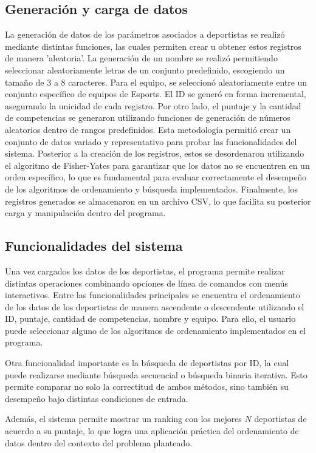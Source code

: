 \subsection{Generación y carga de datos}
La generación de datos de los parámetros asociados a deportistas se realizó mediante distintas funciones, las cuales permiten crear u obtener estos registros de manera 'aleatoria'. La generación de un nombre se realizó permitiendo seleccionar aleatoriamente letras de un conjunto predefinido, escogiendo un tamaño de 3 a 8 caracteres. Para el equipo, se seleccionó aleatoriamente entre un conjunto específico de equipos de Esports. El ID se generó en forma incremental, asegurando la unicidad de cada registro. Por otro lado, el puntaje y la cantidad de competencias se generaron utilizando funciones de generación de números aleatorios dentro de rangos predefinidos. Esta metodología permitió crear un conjunto de datos variado y representativo para probar las funcionalidades del sistema. Posterior a la creación de los registros, estos se desordenaron utilizando el algoritmo de Fisher-Yates para garantizar que los datos no se encuentren en un orden específico, lo que es fundamental para evaluar correctamente el desempeño de los algoritmos de ordenamiento y búsqueda implementados. Finalmente, los registros generados se almacenaron en un archivo CSV, lo que facilita su posterior carga y manipulación dentro del programa.


\subsection{Funcionalidades del sistema}
Una vez cargados los datos de los deportistas, el programa permite realizar distintas operaciones combinando opciones de línea de comandos con menús interactivos. Entre las funcionalidades principales se encuentra el ordenamiento de los datos de los deportistas de manera ascendente o descendente utilizando el ID, puntaje, cantidad de competencias, nombre y equipo. Para ello, el usuario puede seleccionar alguno de los algoritmos de ordenamiento implementados en el programa.

Otra funcionalidad importante es la búsqueda de deportistas por ID, la cual puede realizarse mediante búsqueda secuencial o búsqueda binaria iterativa. Esto permite comparar no solo la correctitud de ambos métodos, sino también su desempeño bajo distintas condiciones de entrada.

Además, el sistema permite mostrar un ranking con los mejores \(N\) deportistas de acuerdo a su puntaje, lo que logra una aplicación práctica del ordenamiento de datos dentro del contexto del problema planteado.

